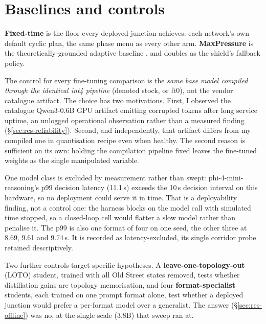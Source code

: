 \section{Baselines and controls}\label{sec:met-baselines}
\textbf{Fixed-time} is the floor every deployed junction achieves:
each network's own default cyclic plan, the same phase menu as every other arm.
\textbf{MaxPressure} is the theoretically-grounded adaptive baseline
\cite{varaiya2013maxpressure}, and doubles as the shield's fallback policy.

The control for every fine-tuning comparison is the \emph{same base model
compiled through the identical int4 pipeline} (denoted stock, or ft0),
not the vendor catalogue artifact. The choice has two motivations. First,
I observed the catalogue Qwen3-0.6B GPU artifact emitting corrupted tokens
after long service uptime, an unlogged operational observation rather than
a measured finding (\S\ref{sec:res-reliability}). Second, and
independently, that artifact differs from my compiled one in quantisation
recipe even when healthy. The second reason is sufficient on its own: holding the
compilation pipeline fixed leaves the fine-tuned weights as the single
manipulated variable.

One model class is excluded by measurement rather than swept:
phi-4-mini-reasoning's p99 decision latency (11.1\,s) exceeds the
10\,s decision interval on this hardware, so no deployment could serve it
in time. That is a deployability finding, not a control one: the harness
blocks on the model call with simulated time stopped, so a closed-loop
cell would flatter a slow model rather than penalise it. The p99 is also
one format of four on one seed, the other three at 8.69, 9.61 and
9.74\,s. It is recorded as latency-excluded, its single corridor probe
retained descriptively.

Two further controls target specific hypotheses. A \textbf{leave-one-topology-out}
(LOTO) student, trained with all Old Street states removed, tests whether
distillation gains are topology memorisation, and four \textbf{format-specialist}
students, each trained on one prompt format alone, test whether a deployed
junction would prefer a per-format model over a generalist. The answer
(\S\ref{sec:res-offline}) was no, at the single scale (3.8B) that sweep
ran at.


